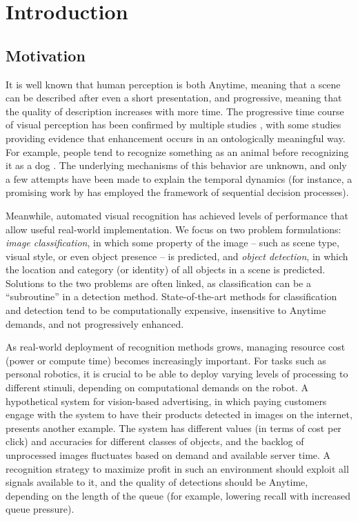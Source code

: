 \chapter{Introduction}\label{sec:introduction}

\section{Motivation}

It is well known that human perception is both Anytime, meaning that a scene can be described after even a short presentation, and progressive, meaning that the quality of description increases with more time.
The progressive time course of visual perception has been confirmed by multiple studies \parencite{Vanrullen-1996,Fei-Fei-Vision-2007}, with some studies providing evidence that enhancement occurs in an ontologically meaningful way.
For example, people tend to recognize something as an animal before recognizing it as a dog \parencite{Mace-PloS-2009}.
The underlying mechanisms of this behavior are unknown, and only a few attempts have been made to explain the temporal dynamics (for instance, a promising work by \cite{Hegde-Neuro-2008} has employed the framework of sequential decision processes).

Meanwhile, automated visual recognition has achieved levels of performance that allow useful real-world implementation.
We focus on two problem formulations: \emph{image classification}, in which some property of the image -- such as scene type, visual style, or even object presence -- is predicted, and \emph{object detection}, in which the location and category (or identity) of all objects in a scene is predicted.
Solutions to the two problems are often linked, as classification can be a ``subroutine'' in a detection method.
State-of-the-art methods for classification and detection tend to be computationally expensive, insensitive to Anytime demands, and not progressively enhanced.

As real-world deployment of recognition methods grows, managing resource cost (power or compute time) becomes increasingly important.
For tasks such as personal robotics, it is crucial to be able to deploy varying levels of processing to different stimuli, depending on computational demands on the robot.
A hypothetical system for vision-based advertising, in which paying customers engage with the system to have their products detected in images on the internet, presents another example.
The system has different values (in terms of cost per click) and accuracies for different classes of objects, and the backlog of unprocessed images fluctuates based on demand and available server time.
A recognition strategy to maximize profit in such an environment should exploit all signals available to it, and the quality of detections should be Anytime, depending on the length of the queue (for example, lowering recall with increased queue pressure).

